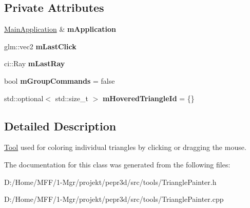 \subsection*{Private Attributes}
\begin{DoxyCompactItemize}
\item 
\mbox{\label{classpepr3d_1_1_triangle_painter_a60d6d50cc1046ef380ddf04abd1e6f3e}} 
\mbox{\hyperlink{classpepr3d_1_1_main_application}{Main\+Application}} \& {\bfseries m\+Application}
\item 
\mbox{\label{classpepr3d_1_1_triangle_painter_a8f3689cb00111eff5f25876e5b5c8096}} 
glm\+::vec2 {\bfseries m\+Last\+Click}
\item 
\mbox{\label{classpepr3d_1_1_triangle_painter_a61bcf0a89c73279b23e605c8494fe7ec}} 
ci\+::\+Ray {\bfseries m\+Last\+Ray}
\item 
\mbox{\label{classpepr3d_1_1_triangle_painter_a75e4e0d40def32ec1cd612ad089fe2d8}} 
bool {\bfseries m\+Group\+Commands} = false
\item 
\mbox{\label{classpepr3d_1_1_triangle_painter_ac2f1a64760c713b39c4dcf1fea51c65e}} 
std\+::optional$<$ std\+::size\+\_\+t $>$ {\bfseries m\+Hovered\+Triangle\+Id} = \{\}
\end{DoxyCompactItemize}


\subsection{Detailed Description}
\mbox{\hyperlink{classpepr3d_1_1_tool}{Tool}} used for coloring individual triangles by clicking or dragging the mouse. 

The documentation for this class was generated from the following files\+:\begin{DoxyCompactItemize}
\item 
D\+:/\+Home/\+M\+F\+F/1-\/\+Mgr/projekt/pepr3d/src/tools/Triangle\+Painter.\+h\item 
D\+:/\+Home/\+M\+F\+F/1-\/\+Mgr/projekt/pepr3d/src/tools/Triangle\+Painter.\+cpp\end{DoxyCompactItemize}
